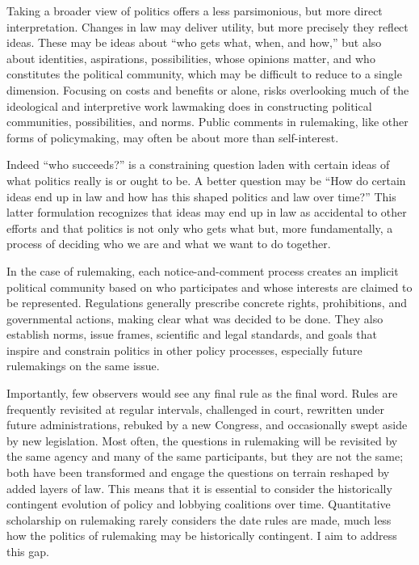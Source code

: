 Taking a broader view of politics offers a less parsimonious, but more direct interpretation. Changes in law may deliver utility, but more precisely they reflect ideas. These may be ideas about ``who gets what, when, and how,'' but also about identities, aspirations, possibilities, whose opinions matter, and who constitutes the political community, which may be difficult to reduce to a single dimension. Focusing on costs and benefits or alone, risks overlooking much of the ideological and interpretive work lawmaking does in constructing political communities, possibilities, and norms. Public comments in rulemaking, like other forms of policymaking, may often be about more than self-interest. 

Indeed ``who succeeds?'' is a constraining question laden with certain ideas of what politics really is or ought to be. A better question may be ``How do certain ideas end up in law and how has this shaped politics and law over time?'' This latter formulation recognizes that ideas may end up in law as accidental to other efforts and that politics is not only who gets what but, more fundamentally, a process of deciding who we are and what we want to do together. 

In the case of rulemaking, each notice-and-comment process creates an implicit political community based on who participates and whose interests are claimed to be represented. Regulations generally prescribe concrete rights, prohibitions, and governmental actions, making clear what was decided to be done. They also establish norms, issue frames, scientific and legal standards, and goals that inspire and constrain politics in other policy processes, especially future rulemakings on the same issue.

Importantly, few observers would see any final rule as the final word. Rules are frequently revisited at regular intervals, challenged in court, rewritten under future administrations, rebuked by a new Congress, and occasionally swept aside by new legislation. Most often, the questions in rulemaking will be revisited by the same agency and many of the same participants, but they are not the same; both have been transformed and engage the questions on terrain reshaped by added layers of law. This means that it is essential to consider the historically contingent evolution of policy and lobbying coalitions over time. Quantitative scholarship on rulemaking rarely considers the date rules are made, much less how the politics of rulemaking may be historically contingent. I aim to address this gap. 

